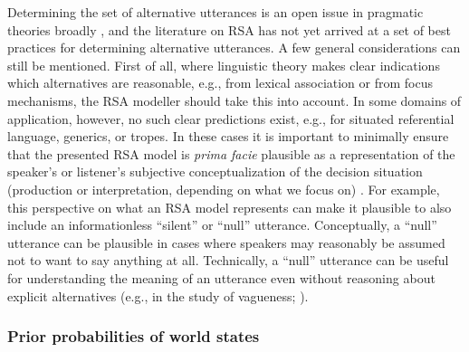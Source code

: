 \documentclass{sp}
\begin{document}
Determining the set of alternative utterances is an open issue in pragmatic theories broadly \citep{ChemlaSingh2014:Remarks-on-the-,Katzir2007:Structurally-De,FoxKatzir2011:On-the-Characte}, and the literature on RSA has not yet arrived at a set of best practices for determining alternative utterances.
A few general considerations can still be mentioned.
First of all, where linguistic theory makes clear indications which alternatives are reasonable, e.g., from lexical association or from focus mechanisms, the RSA modeller should take this into account.
In some domains of application, however, no such clear predictions exist, e.g., for situated referential language, generics, or tropes.
In these cases it is important to minimally ensure that the presented RSA model is \emph{prima facie} plausible as a representation of the speaker's or listener's subjective conceptualization of the decision situation (production or interpretation, depending on what we focus on) \citep{Franke2012:Pragmatic-Reaso}.
For example, this perspective on what an RSA model represents can make it plausible to also include an informationless ``silent'' or ``null'' utterance.
Conceptually, a ``null'' utterance can be plausible in cases where speakers may reasonably be assumed not to want to say anything at all.
Technically, a ``null'' utterance can be useful for understanding the meaning of an utterance even without reasoning about explicit alternatives (e.g., in the study of vagueness; \citealp{lassitergoodman2013}).


\subsubsection{Prior probabilities of world states}
\end{document}
